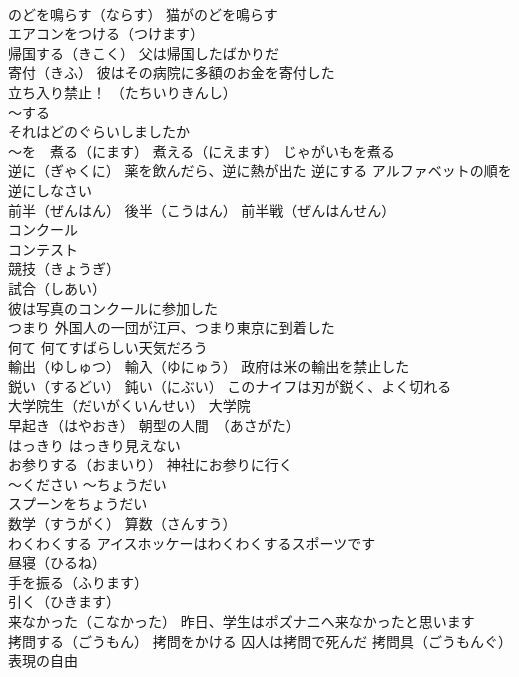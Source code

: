 \documentclass[8pt]{extreport}
\begin{document}
\begin{CJK}{UTF8}{min}
\\	のどを鳴らす（ならす） 猫がのどを鳴らす
\\	エアコンをつける（つけます）
\\	帰国する（きこく） 父は帰国したばかりだ
\\	寄付（きふ） 彼はその病院に多額のお金を寄付した
\\	立ち入り禁止！ （たちいりきんし）
\\	～する 
\\	それはどのぐらいしましたか
\\	～を　煮る（にます） 煮える（にえます） じゃがいもを煮る
\\	逆に（ぎゃくに） 薬を飲んだら、逆に熱が出た 逆にする アルファベットの順を逆にしなさい
\\	前半（ぜんはん） 後半（こうはん） 前半戦（ぜんはんせん）
\\	コンクール 
\\	コンテスト 
\\	競技（きょうぎ） 
\\	試合（しあい） 
\\	彼は写真のコンクールに参加した
\\	つまり 外国人の一団が江戸、つまり東京に到着した
\\	何て 何てすばらしい天気だろう
\\	輸出（ゆしゅつ） 輸入（ゆにゅう） 政府は米の輸出を禁止した
\\	鋭い（するどい） 鈍い（にぶい） このナイフは刃が鋭く、よく切れる
\\	大学院生（だいがくいんせい） 大学院
\\	早起き（はやおき） 朝型の人間　（あさがた）
\\	はっきり はっきり見えない
\\	お参りする（おまいり） 神社にお参りに行く
\\	～ください ～ちょうだい　
\\	スプーンをちょうだい
\\	数学（すうがく） 算数（さんすう）
\\	わくわくする アイスホッケーはわくわくするスポーツです
\\	昼寝（ひるね）
\\	手を振る（ふります）
\\	引く（ひきます）
\\	来なかった（こなかった） 昨日、学生はポズナニへ来なかったと思います
\\	拷問する（ごうもん） 拷問をかける 囚人は拷問で死んだ 拷問具（ごうもんぐ）
\\	表現の自由

\end{CJK}
\end{document}

